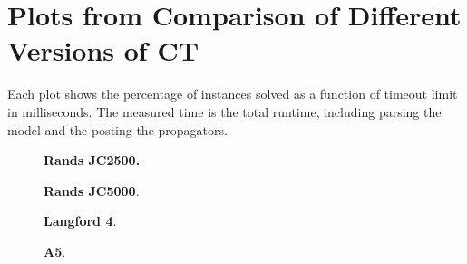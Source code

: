 \documentclass[a4paper,11pt]{article}
\theoremstyle{definition}
\newcommand{\Chapref}[1]{Section~\ref{#1}}
\numberwithin{equation}{section}
\begin{document}






\newpage
\appendix
\section{Plots from Comparison of Different Versions of CT}
\label{app:compare-ct}

Each plot shows the percentage of instances solved as a function
of timeout limit in milliseconds. The measured time is the total
runtime, including parsing the model and the posting
the propagators.

\vspace{2cm}

\begin{figure}[H]
  \begin{minipage}[b][8cm][s]{0.45\textwidth}
    \centering
    \vfill
    \begin{tikzpicture}[scale=0.9]
      
    \end{tikzpicture}
    \vfill
    \caption{\textbf{Rands JC2500.} }
    \vspace{\baselineskip}
  \end{minipage}\qquad
  \begin{minipage}[b][8cm][s]{0.45\textwidth}
    \centering
    \vfill
    \begin{tikzpicture}[scale=0.9]
      
    \end{tikzpicture}
    \vfill
    \caption{\textbf{Rands JC5000}. }
    \vspace{\baselineskip}
  \end{minipage}\qquad
\end{figure}
\begin{figure}[H]
  \begin{minipage}[b][8cm][s]{0.45\textwidth}
    \centering
    \vfill
    \begin{tikzpicture}[scale=0.9]
      
    \end{tikzpicture}
    \vfill
    \caption{\textbf{Langford 4}.}
    \vspace{\baselineskip}
  \end{minipage}\qquad
  \begin{minipage}[b][8cm][s]{0.45\textwidth}
    \centering
    \vfill
    \begin{tikzpicture}[scale=0.9]
      
    \end{tikzpicture}
    \vfill
    \caption{\textbf{A5}.}
    \vspace{\baselineskip}
  \end{minipage}\qquad

\end{figure}
\end{document}
